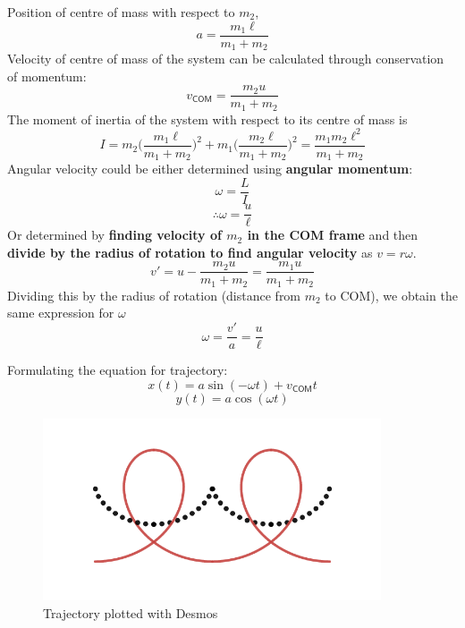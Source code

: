 Position of centre of mass with respect to $m_2$,
\begin{equation}
    a=\frac{m_1 \ell}{m_1+m_2}
\end{equation}
Velocity of centre of mass of the system can be calculated through conservation of momentum:
\begin{equation}
    v_{\textsf{COM}}=\frac{m_2u}{m_1+m_2}
\end{equation}
The moment of inertia of the system with respect to its centre of mass is
\begin{equation}
    I=m_2 \bigg(\frac{m_1 \ell}{m_1+m_2}\bigg)^2+m_1\bigg(\frac{m_2 \ell}{m_1+m_2}\bigg)^2=\frac{m_1 m_2 \ell^2}{m_1+m_2}
\end{equation}
Angular velocity could be either determined using \textbf{angular momentum}:
\begin{equation}
    \omega=\frac{L}{I}
\end{equation}
\begin{equation}
    \therefore\omega=\frac{u}{\ell}
\end{equation}
Or determined by \textbf{finding velocity of $m_2$ in the COM frame} and then \textbf{divide by the radius of rotation to find angular velocity} as $v=r\omega$.
\begin{equation}
    v'=u-\frac{m_2 u}{m_1+m_2}=\frac{m_1 u}{m_1+m_2}
\end{equation}
Dividing this by the radius of rotation (distance from $m_2$ to COM), we obtain the same expression for $\omega$
\begin{equation}
    \omega= \frac{v'}{a}=\frac{u}{\ell}
\end{equation}

Formulating the equation for trajectory:
\begin{equation}
    x(t)=a \sin (-\omega t)+v_{\textsf{COM}}t
\end{equation}
\begin{equation}
    y(t)=a \cos(\omega t)
\end{equation}
\begin{figure}[H]
    \centering
    \includegraphics[width=10cm]{graph latex.jpeg}
    \caption{Trajectory plotted with Desmos}
    \label{fig:2}
\end{figure}

